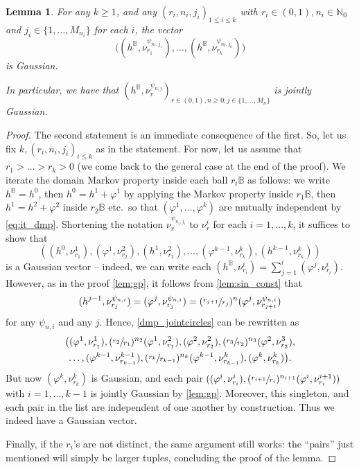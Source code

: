 \documentclass[10pt]{amsart}
\newtheorem{lemma}[theorem]{Lemma}
\theoremstyle{definition}
\newcommand{\N}{\mathbb{N}}
\newcommand{\B}{\mathbb{B}}\let\D\B\let\Ub\B
\begin{document}
\begin{lemma}
For any $k \geq 1$, and any $(r_i,n_i,j_i)_{1\le i \le k}$ with $r_i\in (0,1), n_i\in \N_0$ and $j_i\in \{1,\dots, M_{n_i}\}$ for each $i$, the vector\vspace*{-3pt}
\[
\bigl((h^\B, \nu^{\psi_{n_1,j_1}}_{r_1}),\dots, (h^\B, \nu^{\psi_{n_k,j_k}}_{r_k})\bigr)
\]
is Gaussian.

In particular, we have that $(h^\B, \nu^{\psi_{n,j}}_r)_{r \in (0,1), n \geq 0, j \in \{1, \dots, M_n\}}$ is jointly Gaussian.
\end{lemma}

\begin{proof}
The second statement is an immediate consequence of the first. So, let us fix $k,(r_i,n_i,j_i)_{i\le k}$ as in the statement.
For now, let us assume that $r_1>\dots>r_k>0$ (we come back to the general case at the end of the proof). We iterate the domain Markov property inside each ball $r_i\B$ as follows: we write $h^\B=h^0$, then $h^0=h^1+\varphi^1$ by applying the Markov property inside $r_1\B$, then $h^1=h^2+\varphi^2$ inside $r_2\B$ etc.\ so that $(\varphi^1,\dots, \varphi^k)$ are mutually independent by \eqref{eq:it_dmp}. Shortening the notation $\nu_r^{\psi_{n_i,j_i}}$ to $\nu_r^i$ for each $i=1,\dots, k$, it suffices to show that
\begin{equation}\label{dmp_jointcircles}\left((h^0,\nu_{r_1}^1),(\varphi^1,\nu_{r_2}^2),(h^1,\nu_{r_2}^2),\dots, (\varphi^{k-1},\nu_{r_k}^k),(h^{k-1},\nu_{r_k}^k)\right)\end{equation} is a Gaussian vector -- indeed, we can write each $(h^\B, \nu_{r_i}^i) = \sum_{j =1}^i (\varphi^j, \nu_{r_i}^i)$. {However, as in the proof \cref{lem:gp}, it follows from \cref{lem:sin_const}}
that\vspace*{-3pt}
\[
(h^{j-1},\nu_{r_j}^{\psi_{n,i}})=(\varphi^j,\nu_{r_j}^{\psi_{n,i}})=(\sfrac{r_{j+1}}{r_j})^{n}(\varphi^j,\nu_{r_{j+1}}^{\psi_{n,i}})
\]
for any $\psi_{n,i}$ and any $j$.
Hence, \eqref{dmp_jointcircles} can be rewritten as\vspace*{-3pt}
\begin{multline*}
\big((\varphi^1,\nu_{r_1}^1),(\sfrac{r_2}{r_1})^{n_2}(\varphi^1,\nu_{r_1}^2),(\varphi^2,\nu_{r_2}^2),(\sfrac{r_3}{r_2})^{n_3}(\varphi^2,\nu_{r_2}^3),\\
\dots,
(\varphi^{k-1},\nu_{r_{k-1}}^{k-1}),(\sfrac{r_k}{r_{k-1}})^{n_k}(\varphi^{k-1},\nu_{r_{k-1}}^k),(\varphi^k,\nu_{r_k}^k)\big).
\end{multline*}
{But now $(\varphi^k,\nu_{r_k}^k)$ is Gaussian, and each pair $((\varphi^i,\nu_{r_i}^i),(\sfrac{r_{i+1}}{r_i})^{n_{i+1}}(\varphi^i,\nu_{r_i}^{i+1}))$ with $i = 1, \dots, k -1$ is jointly Gaussian by \cref{lem:gp}. Moreover, this singleton, and each pair in the list are independent of one another by construction.} Thus we indeed have a Gaussian vector.

Finally, if the $r_i$'s are not distinct, the same argument still works: the ``pairs'' just mentioned will simply be larger tuples, concluding the proof of the lemma.
\end{proof}
\end{document}
